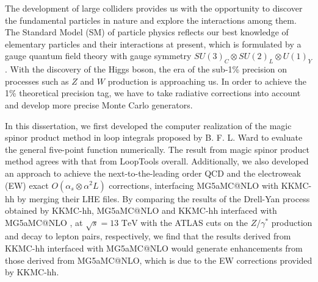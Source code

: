 The development of large colliders provides us with the opportunity to discover the fundamental particles in nature and explore the interactions among them. The Standard Model (SM) of particle physics reflects our best knowledge of elementary particles and their interactions at present, which is formulated by a gauge quantum field theory with gauge symmetry $SU(3)_C \otimes SU(2)_L \otimes U(1)_Y$. With the discovery of the Higgs boson, the era of the sub-1\% precision on processes such as $Z$ and
$W$ production is approaching us. In order to achieve the 1\% theoretical precision tag, we have to take radiative corrections into account and develop more precise Monte Carlo generators.

In this dissertation, we first developed the computer realization of the magic spinor product method in loop integrals proposed by B. F. L. Ward to evaluate the general five-point function
numerically. The result from magic spinor product method agrees with that from LoopTools overall. Additionally, we also developed an approach to achieve the next-to-the-leading order QCD and the electroweak (EW) exact $O(\alpha_s\otimes\alpha^2L)$ corrections, interfacing MG5\textunderscore aMC@NLO with KKMC-hh by merging their LHE files. By comparing the results of the Drell-Yan process obtained by KKMC-hh, MG5\textunderscore aMC@NLO and KKMC-hh interfaced with MG5\textunderscore aMC@NLO , at $\sqrt{s}=13\text{ TeV}$ with the ATLAS cuts on the $Z/\gamma^\ast$ production and decay to lepton pairs, respectively, we find that the results derived from KKMC-hh interfaced with MG5\textunderscore aMC@NLO would generate enhancements from those derived from MG5\textunderscore aMC@NLO, which is due to the EW corrections provided by KKMC-hh.